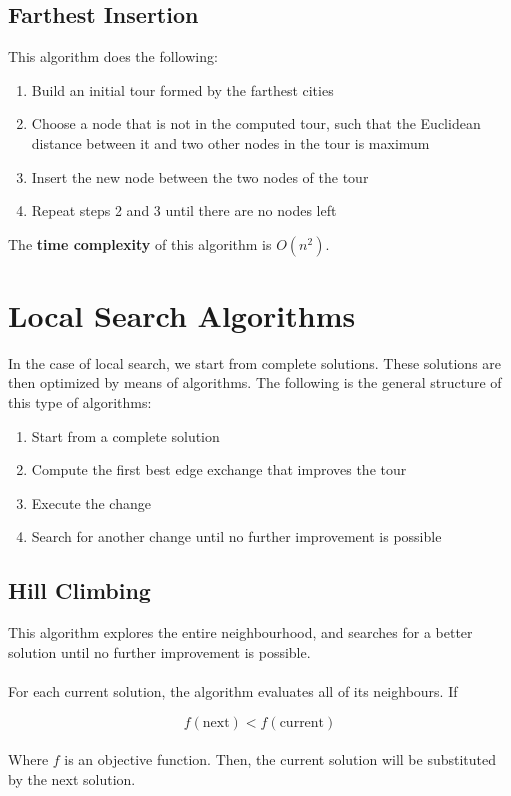 \documentclass{article}
\begin{document}
\subsection{Farthest Insertion}
This algorithm does the following:

\begin{enumerate}
	\item Build an initial tour formed by the farthest cities
	\item Choose a node that is not in the computed tour, such that the Euclidean distance between it and two other nodes in the tour is maximum
	\item Insert the new node between the two nodes of the tour
	\item Repeat steps 2 and 3 until there are no nodes left
\end{enumerate}
The \textbf{time complexity} of this algorithm is $O(n^2)$.

\section{Local Search Algorithms}
In the case of local search, we start from complete solutions. These solutions are then optimized by means of algorithms. The following is the general structure of this type of algorithms:

\begin{enumerate}
	\item Start from a complete solution
	\item Compute the first best edge exchange that improves the tour
	\item Execute the change
	\item Search for another change until no further improvement is possible
\end{enumerate}

\subsection{Hill Climbing}
This algorithm explores the entire neighbourhood, and searches for a better solution until no further improvement is possible. \\ \\
For each current solution, the algorithm evaluates all of its neighbours. If

\[ f(\text{next}) < f(\text{current}) \] \\
Where $f$ is an objective function. Then, the current solution will be substituted by the next solution.
\end{document}
